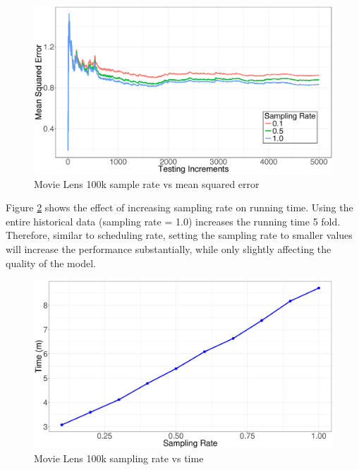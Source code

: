 \documentclass{vldb}
\begin{document}
\begin{figure}[!ht]
\centering
\includegraphics[width=\columnwidth]{../images/experiment-results/movie-lens-sampling-quality-improved.eps}
\caption{Movie Lens 100k sample rate vs mean squared error}
\label{fig:movie-lens-100k-sample-rate}
\end{figure}

Figure \ref{fig:movie-lens-100k-sample-rate-time} shows the effect of increasing sampling rate on running time.
Using the entire historical data (sampling rate = 1.0) increases the running time 5 fold. 
Therefore, similar to scheduling rate, setting the sampling rate to smaller values will increase the performance substantially, while only slightly affecting the quality of the model.


\begin{figure}[H]
\centering
\includegraphics[width=\columnwidth]{../images/experiment-results/movie-lens-100k-sampling-time-improved.eps}
\caption{Movie Lens 100k sampling rate vs time}
\label{fig:movie-lens-100k-sample-rate-time}
\end{figure}
\end{document}
